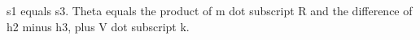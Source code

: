 s1 equals s3. Theta equals the product of m dot subscript R and the difference of h2 minus h3, plus V dot subscript k.